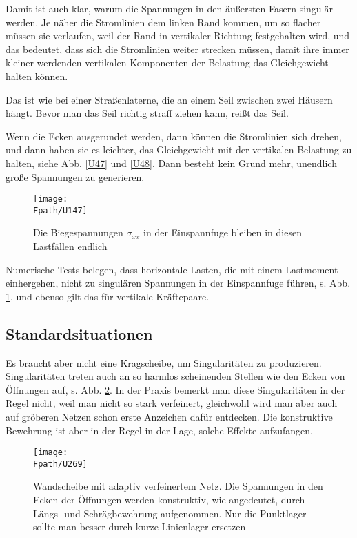 Damit ist auch klar, warum die Spannungen in den \"{a}u{\ss}ersten Fasern singul\"{a}r werden. Je n\"{a}her die Stromlinien dem linken Rand kommen, um so flacher m\"{u}ssen sie verlaufen, weil der Rand in vertikaler Richtung festgehalten wird, und das bedeutet, dass sich die Stromlinien weiter strecken m\"{u}ssen, damit ihre immer kleiner werdenden vertikalen Komponenten der Belastung das Gleichgewicht halten k\"{o}nnen.

Das ist wie bei einer Stra{\ss}enlaterne, die an einem Seil zwischen zwei H\"{a}usern h\"{a}ngt. Bevor man das Seil richtig straff ziehen kann, rei{\ss}t das Seil.

Wenn die Ecken ausgerundet werden, dann k\"{o}nnen die Stromlinien sich drehen, und dann haben sie es leichter, das Gleichgewicht mit der vertikalen Belastung zu halten, siehe Abb. \ref{U47} und \ref{U48}. Dann besteht kein Grund mehr, unendlich gro{\ss}e Spannungen zu generieren.\\

\begin{figure}
\centering
\texttt{[image: \\Fpath/U147]}
\caption{Die Biegespannungen $\sigma_{xx}$ in der Einspannfuge bleiben in diesen Lastf\"{a}llen endlich}
\label{U147}%
\end{figure}%

\begin{remark}
 Numerische Tests belegen, dass horizontale Lasten, die mit einem Lastmoment einhergehen,  nicht zu singul\"{a}ren Spannungen in der Einspannfuge f\"{u}hren, s. Abb. \ref{U147}, und ebenso gilt das f\"{u}r vertikale Kr\"{a}ftepaare.
 \end{remark}


\textcolor{sectionTitleBlue}{\section{Standardsituationen}}
Es braucht aber nicht eine Kragscheibe, um Singularit\"{a}ten zu produzieren. Singularit\"{a}ten treten auch an so harmlos scheinenden Stellen wie den Ecken von \"{O}ffnungen auf, s. Abb. \ref{U269}. In der Praxis bemerkt man diese Singularit\"{a}ten in der Regel nicht, weil man nicht so stark verfeinert, gleichwohl wird man aber auch auf gr\"{o}beren Netzen schon erste Anzeichen daf\"{u}r entdecken. Die konstruktive Bewehrung ist aber in der Regel in der Lage, solche Effekte aufzufangen.
\begin{figure}
\centering
\texttt{[image: \\Fpath/U269]}
\caption{Wandscheibe mit adaptiv verfeinertem Netz. Die Spannungen in den Ecken der \"{O}ffnungen werden konstruktiv, wie angedeutet, durch L\"{a}ngs- und Schr\"{a}gbewehrung aufgenommen. Nur die Punktlager sollte man besser durch kurze Linienlager ersetzen}
\label{U269}%
\end{figure}%

